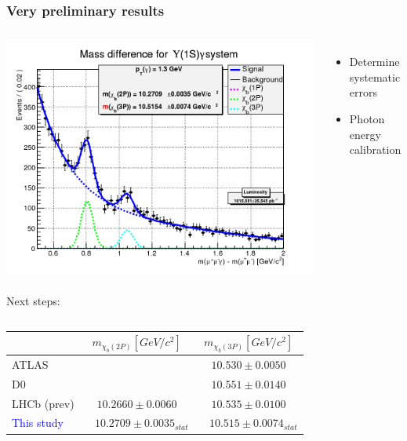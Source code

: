 \documentclass{beamer}
\begin{document}
\begin{frame}[t]
\frametitle{Very preliminary results}
\begin{columns}[T]
\includegraphics[height=.4\textheight]{images/m3p.png}\\~\\
Next steps:

\begin{itemize}
  \item Determine systematic errors
  \item Photon energy calibration
\end{itemize}
\end{columns}
\begin{tabular}{|l|c|c|}\hline
              &  $m_{\chi_b(2P)} [GeV/c^2]$ & $m_{\chi_b(3P)} [GeV/c^2]$\\ \hline
ATLAS         &                             & $10.530 \pm 0.0050$\\
D0            &                             & $10.551 \pm 0.0140$\\
LHCb (prev)   &  $10.2660 \pm 0.0060$       & $10.535 \pm 0.0100$\\ \hline
\textcolor{blue}{This study} & $~~~~10.2709 \pm 0.0035_{stat}$ & $~~~~10.515 \pm 0.0074_{stat}$ \\ \hline
\end{tabular}
\end{frame}
\end{document}
